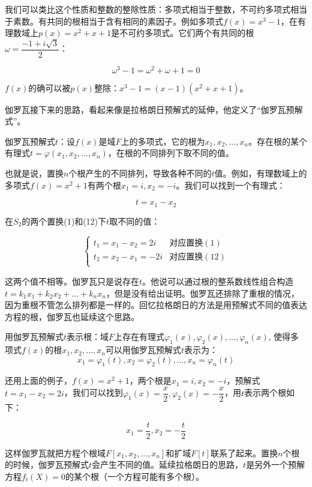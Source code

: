 \documentclass[b5paper]{ctexart}
\begin{document}
我们可以类比这个性质和整数的整除性质：多项式相当于整数，不可约多项式相当于素数。有共同的根相当于含有相同的素因子。例如多项式$f(x) = x^3 - 1$，在有理数域上$p(x) = x^2 + x + 1$是不可约多项式。它们两个有共同的根$\omega = \dfrac{-1 + i\sqrt{3}}{2}$：

\[
\omega^3 - 1 = \omega^2 + \omega + 1 = 0
\]

$f(x)$的确可以被$p(x)$整除：$x^3 - 1 = (x - 1)(x^2 + x + 1)$。

伽罗瓦接下来的思路，看起来像是拉格朗日预解式的延伸，他定义了“伽罗瓦预解式”。

\begin{lemma}伽罗瓦预解式$t$：设$f(x)$是域$F$上的多项式，它的根为$x_1, x_2, ..., x_n$。存在根的某个有理式$t = \varphi(x_1, x_2, ..., x_n)$，在根的不同排列下取不同的值。
\end{lemma}

也就是说，置换$n$个根产生的不同排列，导致各种不同的$t$值。例如，有理数域上的多项式$f(x) = x^2 + 1$有两个根$x_1 = i, x_2 = -i$。我们可以找到一个有理式：

\[
t = x_1 - x_2
\]

在$S_2$的两个置换(1)和(12)下$t$取不同的值：

\[
\begin{cases}
t_1 = x_1 - x_2 = 2i & \text{对应置换} (1) \\
t_2 = x_2 - x_1 = -2i & \text{对应置换} (12) \\
\end{cases}
\]

这两个值不相等。伽罗瓦只是说存在$t$。他说可以通过根的整系数线性组合构造$t = k_1x_1 + k_2x_2 + ... + k_nx_n$，但是没有给出证明。伽罗瓦还排除了重根的情况，因为重根不管怎么排列都是一样的。回忆拉格朗日的方法是用预解式不同的值表达方程的根，伽罗瓦也延续这个思路。

\begin{lemma}用伽罗瓦预解式$t$表示根：域$F$上存在有理式$\varphi_1(x), \varphi_2(x), ..., \varphi_n(x)$, 使得多项式$f(x)$的根$x_1, x_2, ..., x_n$可以用伽罗瓦预解式$t$表示为：
\[
x_1 = \varphi_1(t), x_2 = \varphi_2(t), ..., x_n = \varphi_n(t)
\]
\end{lemma}

还用上面的例子，$f(x) = x^2 + 1$，两个根是$x_1 = i, x_2 = -i$，预解式$t = x_1 - x_2 = 2i$，我们可以找到$\varphi_1(x) = \dfrac{x}{2}, \varphi_2(x) = -\dfrac{x}{2}$，用$t$表示两个根如下：

\[
x_1 = \dfrac{t}{2}, x_2 = -\dfrac{t}{2}
\]

这样伽罗瓦就把方程个根域$F[x_1, x_2, ..., x_n]$和扩域$F[t]$联系了起来。置换$n$个根的时候，伽罗瓦预解式$t$会产生不同的值。延续拉格朗日的思路，$t$是另外一个预解方程$f_t(X) = 0$的某个根（一个方程可能有多个根）。
\end{document}
